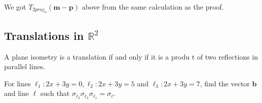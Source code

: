 We got \( T_{2proj_{n}}\left(\mathbf{m-p}\right) \) above from the same calculation as the proof.

\subsection{Translations in \( \mathbb{R}^{2} \)}

\begin{corollary}
 A plane isometry is a translation if and only if it is a produ t of two reflections in parallel lines.
\end{corollary}

\begin{example}
 For lines \( \ell_{1} : 2x + 3y = 0, \ell_{2} : 2x + 3y = 5 \) and \( \ell_{3}: 2x + 3y = 7\), find the vector \( \mathbf{b} \)and line \( \ell \) such that 
 \( \sigma_{\ell_{2}} \sigma_{\ell_{2}} \sigma_{\ell_{1}} = \sigma_{\ell} \).
\end{example}

